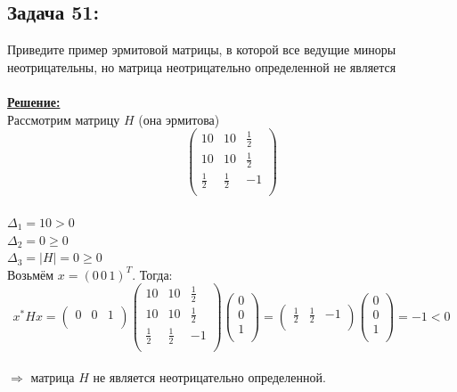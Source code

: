 \documentclass[a4paper,12pt,titlepage,final]{article}
\begin{document}
\subsection*{Задача 51:}
\noindent Приведите пример эрмитовой матрицы, в которой все ведущие миноры неотрицательны, но матрица неотрицательно определенной не является \\ \\
\textbf{\underline{Решение:}} \\
Рассмотрим матрицу $H$ (она эрмитова) 
$$\begin{pmatrix}
    10 & 10 & \frac{1}{2} \\
    10 & 10 & \frac{1}{2} \\
    \frac{1}{2} & \frac{1}{2} & -1 \\
\end{pmatrix}$$ \\
$\Delta_1 = 10 > 0$ \\
$\Delta_2 = 0 \geq 0$ \\
$\Delta_3 = |H| = 0 \geq 0$ \\
Возьмём $x = (0\,0\,1)^{T}$. Тогда: \\
$$ x^{*}Hx =
\begin{pmatrix}
    0 & 0 & 1 \\
\end{pmatrix}    
\begin{pmatrix}
    10 & 10 & \frac{1}{2} \\
    10 & 10 & \frac{1}{2} \\
    \frac{1}{2} & \frac{1}{2} & -1 \\
\end{pmatrix} 
\begin{pmatrix}
    0 \\ 0 \\ 1 \\
\end{pmatrix}
=
\begin{pmatrix}
    \frac{1}{2} & \frac{1}{2} & -1 \\
\end{pmatrix}    
\begin{pmatrix}
    0 \\ 0 \\ 1 \\
\end{pmatrix}
= -1 < 0
$$ \\
$\Rightarrow$ матрица $H$ не является неотрицательно определенной. \blacksquare \\ \\ \\
\end{document}
